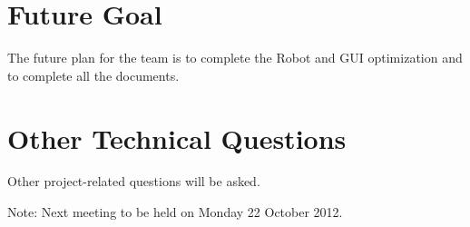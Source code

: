 \documentclass[11pt, a4paper]{article}
\begin{document}
\section{Future Goal}
The future plan for the team is to complete the Robot and GUI optimization and to complete all the documents.

\section{Other Technical Questions}
Other project-related questions will be asked.



\vspace*{10pt}
\noindent Note: Next meeting to be held on Monday 22 October 2012.
\end{document}
